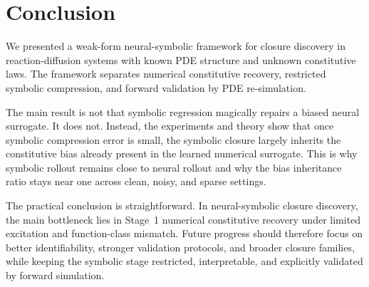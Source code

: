\section{Conclusion}

We presented a weak-form neural-symbolic framework for closure discovery in reaction-diffusion systems with known PDE structure and unknown constitutive laws. The framework separates numerical constitutive recovery, restricted symbolic compression, and forward validation by PDE re-simulation.

The main result is not that symbolic regression magically repairs a biased neural surrogate. It does not. Instead, the experiments and theory show that once symbolic compression error is small, the symbolic closure largely inherits the constitutive bias already present in the learned numerical surrogate. This is why symbolic rollout remains close to neural rollout and why the bias inheritance ratio stays near one across clean, noisy, and sparse settings.

The practical conclusion is straightforward. In neural-symbolic closure discovery, the main bottleneck lies in Stage~1 numerical constitutive recovery under limited excitation and function-class mismatch. Future progress should therefore focus on better identifiability, stronger validation protocols, and broader closure families, while keeping the symbolic stage restricted, interpretable, and explicitly validated by forward simulation.
